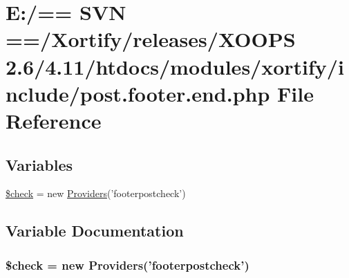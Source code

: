 \hypertarget{post_8footer_8end_8php}{\section{E\-:/== S\-V\-N ==/\-Xortify/releases/\-X\-O\-O\-P\-S 2.6/4.11/htdocs/modules/xortify/include/post.footer.\-end.\-php File Reference}
\label{post_8footer_8end_8php}
}
\subsection*{Variables}
\begin{DoxyCompactItemize}
\item 
\hyperlink{post_8footer_8end_8php_a830cf70d25fefacddcf4c6bc3fd7a0e0}{\$check} = new \hyperlink{class_providers}{Providers}('footerpostcheck')
\end{DoxyCompactItemize}


\subsection{Variable Documentation}
\hypertarget{post_8footer_8end_8php_a830cf70d25fefacddcf4c6bc3fd7a0e0}{
\subsubsection[{\$check}]{\setlength{\rightskip}{0pt plus 5cm}\$check = new {\bf Providers}('footerpostcheck')}}\label{post_8footer_8end_8php_a830cf70d25fefacddcf4c6bc3fd7a0e0}
